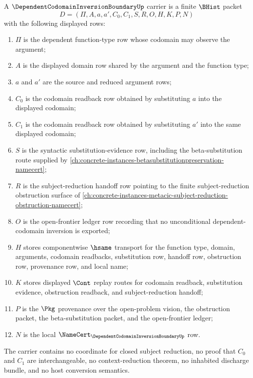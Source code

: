 \begin{definition}
\label{def:dependent-codomain-inversion-boundary-carrier}
A $\DependentCodomainInversionBoundaryUp$ carrier is a finite $\BHist$ packet
$$
D=(\Pi,A,a,a',C_0,C_1,S,R,O,H,K,P,N)
$$
with the following displayed rows:
\begin{enumerate}
\item $\Pi$ is the dependent function-type row whose codomain may observe the argument;
\item $A$ is the displayed domain row shared by the argument and the function type;
\item $a$ and $a'$ are the source and reduced argument rows;
\item $C_0$ is the codomain readback row obtained by substituting $a$ into the displayed codomain;
\item $C_1$ is the codomain readback row obtained by substituting $a'$ into the same displayed codomain;
\item $S$ is the syntactic substitution-evidence row, including the beta-substitution route supplied by \autoref{ch:concrete-instances-betasubstitutionpreservation-namecert};
\item $R$ is the subject-reduction handoff row pointing to the finite subject-reduction obstruction surface of \autoref{ch:concrete-instances-metacic-subject-reduction-obstruction-namecert};
\item $O$ is the open-frontier ledger row recording that no unconditional dependent-codomain inversion is exported;
\item $H$ stores componentwise $\hsame$ transport for the function type, domain, arguments, codomain readbacks, substitution row, handoff row, obstruction row, provenance row, and local name;
\item $K$ stores displayed $\Cont$ replay routes for codomain readback, substitution evidence, obstruction readback, and subject-reduction handoff;
\item $P$ is the $\Pkg$ provenance over the open-problem vision, the obstruction packet, the beta-substitution packet, and the open-frontier ledger;
\item $N$ is the local $\NameCert_{\DependentCodomainInversionBoundaryUp}$ row.
\end{enumerate}
The carrier contains no coordinate for closed subject reduction, no proof that $C_0$ and $C_1$ are interchangeable, no context-reduction theorem, no inhabited discharge bundle, and no host conversion semantics.
\end{definition}

